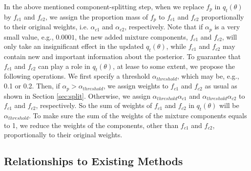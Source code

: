 In the above mentioned component-splitting step, when we replace
$f_p$ in $q_t(\theta)$ by $f_{c1}$ and $f_{c2}$, we assign the
proportion mass of $f_p$ to $f_{c1}$ and $f_{c2}$ proportionally to
their original weights, i.e. $\alpha_{c1}$ and $\alpha_{c2}$,
respectively. Note that if $\alpha_p$ is a very small value, e.g.,
$0.0001$, the new added mixture components, $f_{c1}$ and $f_{c2}$,
will only take an insignificant effect in the updated $q_t(\theta)$,
while $f_{c1}$ and $f_{c2}$ may contain new and important
information about the posterior. To guarantee that $f_{c1}$ and
$f_{c2}$ can play a role in $q_t(\theta)$, at lease to some extent,
we propose the following operations. We first specify a threshold
$\alpha_{threshold}$, which may be, e.g., 0.1 or 0.2. Then, if
$\alpha_p>\alpha_{threshold}$, we assign weights to $f_{c1}$ and
$f_{c2}$ as usual as shown in Section \ref{sec:split}. Otherwise, we
assign $\alpha_{threshold}\alpha_{c1}$ and
$\alpha_{threshold}\alpha_{c2}$ to $f_{c1}$ and $f_{c2}$,
respectively. So the sum of weights of $f_{c1}$ and $f_{c2}$ in
$q_t(\theta)$ will be $\alpha_{threshold}$. To make sure the sum of
the weights of the mixture components equals to 1, we reduce the
weights of the components, other than $f_{c1}$ and $f_{c2}$,
proportionally to their original weights.

\subsection{Relationships to Existing Methods}

